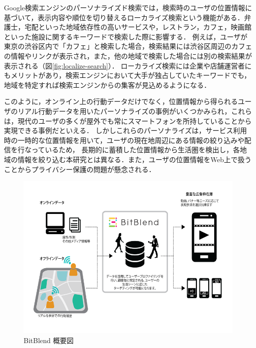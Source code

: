\documentclass[a4paper]{jsarticle}
\begin{document}

Google検索エンジンのパーソナライズド検索では，検索時のユーザの位置情報に基づいて，表示内容や順位を切り替えるローカライズ検索という機能がある．弁護士，宅配といった地域依存性の高いサービスや，レストラン，カフェ，映画館といった施設に関するキーワードで検索した際に影響する．
例えば，ユーザが東京の渋谷区内で「カフェ」と検索した場合，検索結果には渋谷区周辺のカフェの情報やリンクが表示され，また，他の地域で検索した場合には別の検索結果が表示される（図\ref{fig:localize-search}）．
ローカライズ検索には企業や店舗運営者にもメリットがあり，検索エンジンにおいて大手が独占していたキーワードでも，地域を特定すれば検索エンジンからの集客が見込めるようになる．


このように，オンライン上の行動データだけでなく，位置情報から得られるユーザのリアル行動データを用いたパーソナライズの事例がいくつかみられ，これらは，現代のユーザの多くが屋外でも常にスマートフォンを所持していることから実現できる事例だといえる．
しかしこれらのパーソナライズは，サービス利用時の一時的な位置情報を用いて，ユーザの現在地周辺にある情報の絞り込みや配信を行なっているため，
長期的に蓄積した位置情報から生活圏を検出し，各地域の情報を絞り込む本研究とは異なる．また，ユーザの位置情報をWeb上で扱うことからプライバシー保護の問題が懸念される．


\fifigure
\begin{figure}[H]
  \begin{center}
    \includegraphics[width=0.85\hsize]{./images/bitblend.png}
    \caption{BitBlend 概要図}
    \label{fig:bitblend}
  \end{center}
\end{figure}
\fi
\end{document}
